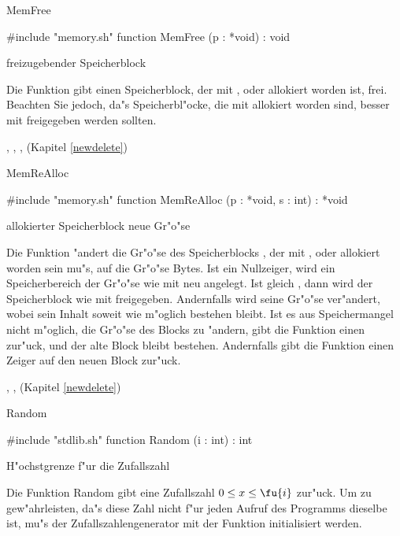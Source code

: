 \newpage

\begin{function}{MemFree}

\syntax
\#include "memory.sh"
function MemFree (p : *void) : void
\endgroup

\parameters
{} freizugebender Speicherblock \cr

\usage
Die Funktion  gibt einen Speicherblock, der mit
,  oder  allokiert worden
ist, frei. Beachten Sie jedoch, da"s Speicherbl"ocke, die mit
 allokiert worden sind, besser mit 
freigegeben werden sollten.

\fseealso
{}, , ,  (Kapitel \ref{newdelete})
\end{function}


\begin{function}{MemReAlloc}

\syntax
\#include "memory.sh"
function MemReAlloc (p : *void, s : int) : *void
\endgroup

\parameters
{} allokierter Speicherblock \cr
{} neue Gr"o"se \cr

\usage
Die Funktion  "andert die Gr"o"se des
Speicherblocks ,
der mit , 
oder  allokiert worden sein mu"s, auf die Gr"o"se 
Bytes. Ist  ein Nullzeiger, wird ein Speicherbereich der
Gr"o"se  wie mit  neu angelegt. Ist 
gleich , dann wird der Speicherblock wie mit 
freigegeben. Andernfalls wird seine Gr"o"se ver"andert, wobei
sein Inhalt soweit wie m"oglich bestehen bleibt. Ist es aus
Speichermangel nicht m"oglich, die Gr"o"se des Blocks zu "andern,
gibt die Funktion einen  zur"uck, und der alte Block
bleibt bestehen. Andernfalls gibt die Funktion einen Zeiger auf
den neuen Block zur"uck.

\fseealso
{}, ,  (Kapitel \ref{newdelete})
\end{function}


\begin{function}{Random}

\syntax
\#include "stdlib.sh"
function Random (i : int) : int
\endgroup

\parameters
{} H"ochstgrenze f"ur die Zufallszahl \cr

\usage
Die Funktion Random gibt eine Zufallszahl
$0 \leq x \leq \fu{i}$ zur"uck. Um zu gew"ahrleisten, da"s
diese Zahl nicht f"ur jeden Aufruf des Programms dieselbe ist,
mu"s der Zufallszahlengenerator mit der Funktion 
initialisiert werden.

\fseealso
{}
\end{function}

